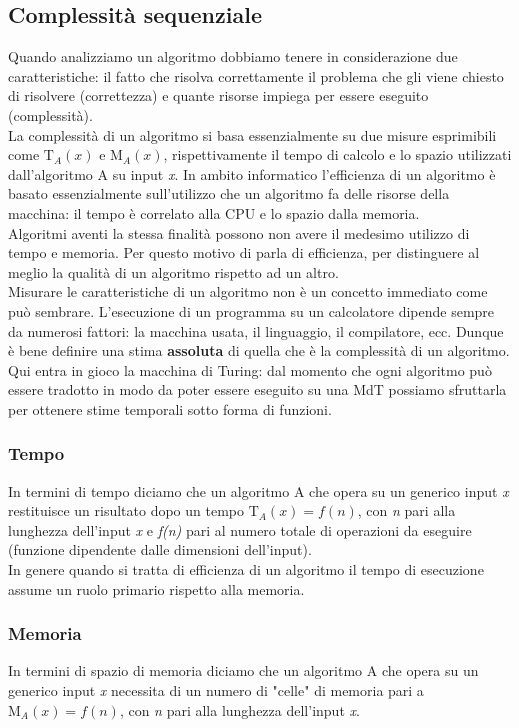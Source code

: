 \subsection{Complessità sequenziale}
Quando analizziamo un algoritmo dobbiamo tenere in considerazione due caratteristiche: il fatto che risolva correttamente il problema che gli viene chiesto di risolvere (correttezza) e quante risorse impiega per essere eseguito (complessità).\\
La complessità di un algoritmo si basa essenzialmente su due misure esprimibili come $\mathrm{T}_{A}(x)$ e $\mathrm{M}_{A}(x)$, rispettivamente il tempo di calcolo e lo spazio utilizzati dall'algoritmo A su input \textit{x}. In ambito informatico l'efficienza di un algoritmo è basato essenzialmente sull'utilizzo che un algoritmo fa delle risorse della macchina: il tempo è correlato alla CPU e lo spazio dalla memoria.\\
Algoritmi aventi la stessa finalità possono non avere il medesimo utilizzo di tempo e memoria. Per questo motivo di parla di efficienza, per distinguere al meglio la qualità di un algoritmo rispetto ad un altro.\\
Misurare le caratteristiche di un algoritmo non è un concetto immediato come può sembrare. L'esecuzione di un programma su un calcolatore dipende sempre da numerosi fattori: la macchina usata, il linguaggio, il compilatore, ecc. Dunque è bene definire una stima \textbf{assoluta} di quella che è la complessità di un algoritmo.\\
Qui entra in gioco la macchina di Turing: dal momento che ogni algoritmo può essere tradotto in modo da poter essere eseguito su una MdT possiamo sfruttarla per ottenere stime temporali sotto forma di funzioni.
\subsubsection{Tempo}
In termini di tempo diciamo che un algoritmo A che opera su un generico input \textit{x} restituisce un risultato dopo un tempo $\mathrm{T}_{A}(x) = f(n)$, con \textit{n} pari alla lunghezza dell'input \textit{x} e \textit{f(n)} pari al numero totale di operazioni da eseguire (funzione dipendente dalle dimensioni dell'input).\\
In genere quando si tratta di efficienza di un algoritmo il tempo di esecuzione assume un ruolo primario rispetto alla memoria.
\subsubsection{Memoria}
In termini di spazio di memoria diciamo che un algoritmo A che opera su un generico input \textit{x} necessita di un numero di "celle" di memoria pari a $\mathrm{M}_{A}(x) = f(n)$, con \textit{n} pari alla lunghezza dell'input \textit{x}.
